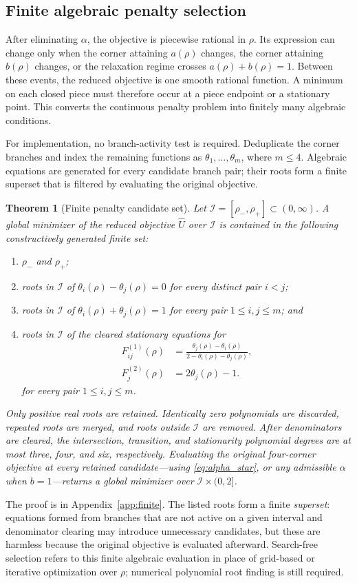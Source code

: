 \documentclass[pdflatex,iicol,sn-mathphys-num]{sn-jnl}
\newtheorem{theorem}{Theorem}[section]
\theoremstyle{definition}
\begin{document}
\subsection{Finite algebraic penalty selection}
After eliminating $\alpha$, the objective is piecewise rational in $\rho$.
Its expression can change only when the corner attaining $a(\rho)$ changes,
the corner attaining $b(\rho)$ changes, or the relaxation regime crosses
$a(\rho)+b(\rho)=1$. Between these events, the reduced objective is one smooth
rational function. A minimum on each closed piece must therefore occur at a
piece endpoint or a stationary point. This converts the continuous penalty
problem into finitely many algebraic conditions.

For implementation, no branch-activity test is required. Deduplicate the
corner branches and index the remaining functions as
$\theta_1,\ldots,\theta_m$, where $m\le4$. Algebraic equations are generated
for every candidate branch pair; their roots form a finite superset that is
filtered by evaluating the original objective.

\begin{theorem}[Finite penalty candidate set]\label{thm:finite}
Let $\mathcal I=[\rho_-,\rho_+]\subset(0,\infty)$. A global minimizer of the
reduced objective $\widehat U$ over $\mathcal I$ is contained in the following
constructively generated finite set:
\begin{enumerate}
\item $\rho_-$ and $\rho_+$;
\item roots in $\mathcal I$ of
$\theta_i(\rho)-\theta_j(\rho)=0$ for every distinct pair $i<j$;
\item roots in $\mathcal I$ of
$\theta_i(\rho)+\theta_j(\rho)=1$ for every pair $1\le i,j\le m$; and
\item roots in $\mathcal I$ of the cleared stationary equations for
\begin{align}
F_{ij}^{(1)}(\rho)&=
\frac{\theta_j(\rho)-\theta_i(\rho)}
{2-\theta_i(\rho)-\theta_j(\rho)},\nonumber\\
F_j^{(2)}(\rho)&=2\theta_j(\rho)-1.
\end{align}
for every pair $1\le i,j\le m$.
\end{enumerate}
Only positive real roots are retained. Identically zero polynomials are
discarded, repeated roots are merged, and roots outside $\mathcal I$ are
removed. After denominators are cleared, the intersection, transition, and
stationarity polynomial degrees are at most three, four, and six,
respectively. Evaluating the original four-corner objective at every retained
candidate---using \eqref{eq:alpha_star}, or any admissible $\alpha$ when
$b=1$---returns a global minimizer over
$\mathcal I\times(0,2]$.
\end{theorem}
The proof is in Appendix~\ref{app:finite}. The listed roots form a finite
\emph{superset}: equations formed from branches that are not active on a given
interval and denominator clearing may introduce unnecessary candidates, but
these are harmless because the original objective is evaluated afterward.
Search-free selection refers to this finite algebraic evaluation in place of
grid-based or iterative optimization over $\rho$; numerical polynomial root
finding is still required.
\end{document}
